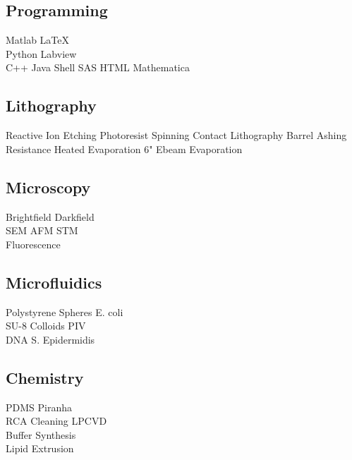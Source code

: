 \documentclass[]{deedy-resume-openfont}
\begin{document}
\begin{minipage}[t]{0.250\textwidth}
\subsection{Programming}
Matlab \textbullet{} \LaTeX \\
Python \textbullet{} Labview \\ 
C++ \textbullet{} Java \textbullet{} Shell \textbullet{} SAS \textbullet{} HTML \textbullet{} Mathematica\\
\sectionsep

\subsection{Lithography}
Reactive Ion Etching \textbullet{} Photoresist Spinning \textbullet{} Contact Lithography \textbullet{} Barrel Ashing \\
Resistance Heated Evaporation \textbullet{} 6" Ebeam Evaporation
\sectionsep

\subsection{Microscopy}
Brightfield \textbullet{} Darkfield \\
SEM \textbullet{} AFM \textbullet{} STM \\
Fluorescence \\
\sectionsep

\subsection{Microfluidics}
Polystyrene Spheres \textbullet{} E. coli\\
SU-8 Colloids \textbullet{} PIV \\
DNA \textbullet{} S. Epidermidis \\
\sectionsep

\subsection{Chemistry}
PDMS \textbullet{} Piranha \\
RCA Cleaning \textbullet{} LPCVD \\
Buffer Synthesis \\
Lipid Extrusion \\

%
%

\end{minipage}
\end{document}
